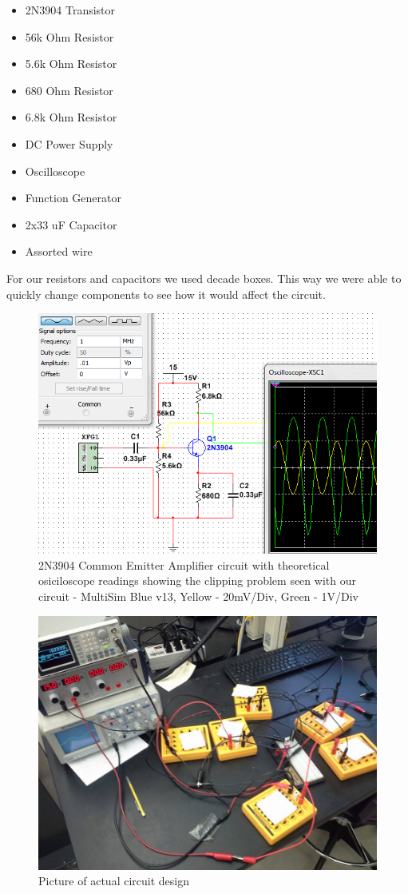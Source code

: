 \documentclass[a4paper]{article}
\begin{document}
\begin{itemize}
\item 2N3904 Transistor
\item 56k Ohm Resistor
\item 5.6k Ohm Resistor
\item 680 Ohm Resistor
\item 6.8k Ohm Resistor
\item DC Power Supply
\item Oscilloscope
\item Function Generator
\item 2x33 uF Capacitor
\item Assorted wire
\end{itemize}

For our resistors and capacitors we used decade boxes.  This way we were able to quickly change components to see how it would affect the circuit.

\begin{figure}
\centering
\includegraphics[width=.5\textwidth]{Transistor_2N3904.png}
\caption{\label{fig:Transistor_2N3904}2N3904 Common Emitter Amplifier circuit with theoretical osiciloscope readings showing the clipping problem seen with our circuit - MultiSim Blue v13, Yellow - 20mV/Div, Green - 1V/Div}
\end{figure}

\begin{figure}
\centering
\includegraphics[width=.4\textwidth]{2n3904_-_Setup.jpg}
\caption{\label{fig:2n3904_-_Setup}Picture of actual circuit design}
\end{figure}
\end{document}
